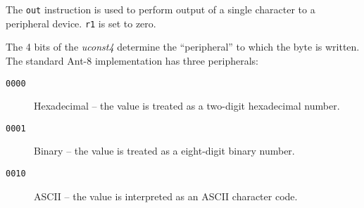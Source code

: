 


The {\tt out} instruction is used to perform output
of a single character to a peripheral device. {\tt r1} is
set to zero.

The 4 bits of the {\em uconst4} determine the ``peripheral'' to which
the byte is written.  The standard Ant-8 implementation has three
peripherals:

\begin{description}

\item[{\tt 0000}] Hexadecimal --
	the value is treated as a two-digit hexadecimal number.

\item[{\tt 0001}] Binary --
	the value is treated as a eight-digit binary number.

\item[{\tt 0010}] {\sc ASCII} --
	the value is interpreted as an {\sc ASCII} character code.

\end{description}



